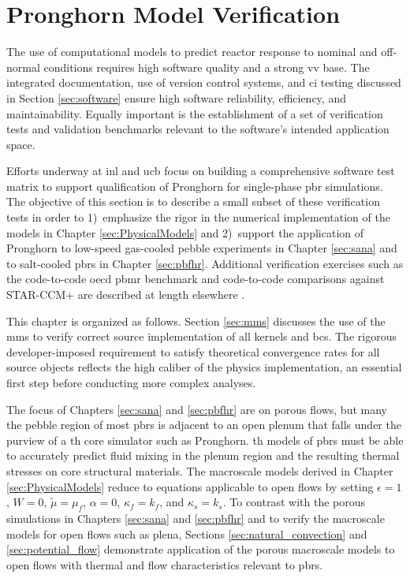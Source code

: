 \chapter{Pronghorn Model Verification}
\label{sec:vv}

The use of computational models to predict reactor response to nominal and off-normal conditions requires high software quality and a strong \gls{vv} base. The integrated documentation, use of version control systems, and \gls{ci} testing discussed in Section \ref{sec:software} ensure high software reliability, efficiency, and maintainability. Equally important is the establishment of a set of verification tests and validation benchmarks relevant to the software's intended application space. 

Efforts underway at \gls{inl} and \gls{ucb} focus on building a comprehensive software test matrix to support qualification of Pronghorn for single-phase \gls{pbr} simulations. The objective of this section is to describe a small subset of these verification tests in order to 1)~emphasize the rigor in the numerical implementation of the models in Chapter \ref{sec:PhysicalModels} and 2)~support the application of Pronghorn to low-speed gas-cooled pebble experiments in Chapter \ref{sec:sana} and to salt-cooled \glspl{pbr} in Chapter \ref{sec:pbfhr}. Additional verification exercises such as the code-to-code \gls{oecd} \gls{pbmr} benchmark and code-to-code comparisons against STAR-CCM+ are described at length elsewhere \cite{balestra,lee_2020}.

This chapter is organized as follows. Section \ref{sec:mms} discusses the use of the \gls{mms} to verify correct source implementation of all kernels and \glspl{bc}. The rigorous developer-imposed requirement to satisfy theoretical convergence rates for all source objects reflects the high caliber of the physics implementation, an essential first step before conducting more complex analyses.

The focus of Chapters \ref{sec:sana} and \ref{sec:pbfhr} are on porous flows, but many the pebble region of most \glspl{pbr} is adjacent to an open plenum that falls under the purview of a \gls{th} core simulator such as Pronghorn. \gls{th} models of \glspl{pbr} must be able to accurately predict fluid mixing in the plenum region and the resulting thermal stresses on core structural materials. The macroscale models derived in Chapter \ref{sec:PhysicalModels} reduce to equations applicable to open flows by setting \(\epsilon=1\), \(W=0\), \(\tilde{\mu}=\mu_f\), \(\alpha=0\), \(\kappa_f=k_f\), and \(\kappa_s=k_s\). To contrast with the porous simulations in Chapters \ref{sec:sana} and \ref{sec:pbfhr} and to verify the macroscale models for open flows such as plena, Sections \ref{sec:natural_convection} and \ref{sec:potential_flow} demonstrate application of the porous macroscale models to open flows with thermal and flow characteristics relevant to \glspl{pbr}.

